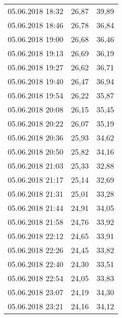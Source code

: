 \documentclass[a4paper,11pt,twoside]{article}
\begin{document}
\begin{longtable}[c]{ccc}
05.06.2018 18:32       & 26,87                & 39,89                          \\
05.06.2018 18:46       & 26,78                & 36,84                          \\
05.06.2018 19:00       & 26,68                & 36,46                          \\
05.06.2018 19:13       & 26,69                & 36,19                          \\
05.06.2018 19:27       & 26,62                & 36,71                          \\
05.06.2018 19:40       & 26,47                & 36,94                          \\
05.06.2018 19:54       & 26,22                & 35,87                          \\
05.06.2018 20:08       & 26,15                & 35,45                          \\
05.06.2018 20:22       & 26,07                & 35,19                          \\
05.06.2018 20:36       & 25,93                & 34,62                          \\
05.06.2018 20:50       & 25,82                & 34,16                          \\
05.06.2018 21:03       & 25,33                & 32,88                          \\
05.06.2018 21:17       & 25,14                & 32,69                          \\
05.06.2018 21:31       & 25,01                & 33,28                          \\
05.06.2018 21:44       & 24,91                & 34,05                          \\
05.06.2018 21:58       & 24,76                & 33,92                          \\
05.06.2018 22:12       & 24,65                & 33,91                          \\
05.06.2018 22:26       & 24,45                & 33,82                          \\
05.06.2018 22:40       & 24,30                & 33,51                          \\
05.06.2018 22:54       & 24,05                & 33,83                          \\
05.06.2018 23:07       & 24,19                & 34,30                          \\
05.06.2018 23:21       & 24,16                & 34,12                          \\

\end{longtable}
\end{document}
